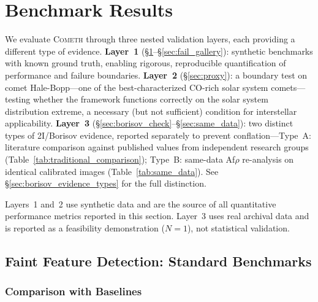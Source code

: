 \documentclass[usenatbib]{mnras}
\begin{document}
\section{Benchmark Results}\label{sec:results}

We evaluate \textsc{Cometh} through three nested validation layers, each providing a different type of evidence. \textbf{Layer~1} (\S\ref{sec:results}--\S\ref{sec:fail_gallery}): synthetic benchmarks with known ground truth, enabling rigorous, reproducible quantification of performance and failure boundaries. \textbf{Layer~2} (\S\ref{sec:proxy}): a boundary test on comet Hale-Bopp---one of the best-characterized CO-rich solar system comets---testing whether the framework functions correctly on the solar system distribution extreme, a necessary (but not sufficient) condition for interstellar applicability. \textbf{Layer~3} (\S\ref{sec:borisov_check}--\S\ref{sec:same_data}): two distinct types of 2I/Borisov evidence, reported separately to prevent conflation---Type~A: literature comparison against published values from independent research groups (Table~\ref{tab:traditional_comparison}); Type~B: same-data Af$\rho$ re-analysis on identical calibrated images (Table~\ref{tab:same_data}). See \S\ref{sec:borisov_evidence_types} for the full distinction.

Layers~1 and~2 use synthetic data and are the source of all quantitative performance metrics reported in this section. Layer~3 uses real archival data and is reported as a feasibility demonstration ($N=1$), not statistical validation.

\subsection{Faint Feature Detection: Standard Benchmarks}

\subsubsection{Comparison with Baselines}
\end{document}
